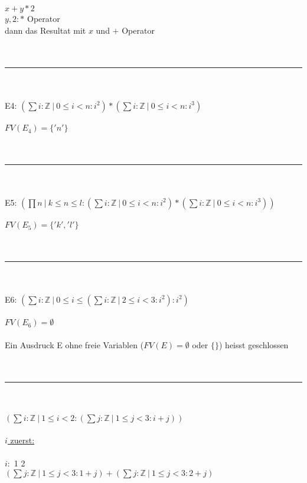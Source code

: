 \documentclass[18pt,a4paper]{article}
\newcommand{\tab}{\hspace*{2em}}
\begin{document}
$x + y * 2$\\
$y , 2 : *$ Operator\\
dann das Resultat mit $x$ und $+$ Operator\\
\\
\\
\rule{\textwidth}{0.4mm}\\
\\
E4: $(\sum{i} : \mathbb{Z} \:\vert\: 0\leqslant i< n : i^2 ) * (\sum{i} : \mathbb{Z} \:\vert\: 0\leqslant i< n : i^3 )$\\
\\
$FV(E_4) = \{'n'\}$\\
\\
\\
\rule{\textwidth}{0.4mm}\\
\\
E5: $( \prod{n} \:\vert\: k\leqslant n \leqslant l : (\sum{i} : \mathbb{Z} \:\vert\: 0\leqslant i< n : i^2 ) * (\sum{i} : \mathbb{Z} \:\vert\: 0\leqslant i< n : i^3 ) )$\\
\\
$FV(E_5) = \{'k', 'l'\}$\\
\\
\\
\rule{\textwidth}{0.4mm}\\
\\
E6: $(\sum{i} : \mathbb{Z} \:\vert\: 0\leqslant i\leqslant (\sum{i} : \mathbb{Z} \:\vert\: 2\leqslant i< 3 : i^2 ) : i^2 )$\\
\\
$FV(E_6) = \emptyset$\\
\\
Ein Ausdruck E ohne freie Variablen ($FV(E) = \emptyset$ oder $\{\}$) heisst geschlossen\\
\\
\\
\rule{\textwidth}{0.4mm}\\
\\
 $(\sum{i} : \mathbb{Z} \:\vert\: 1\leqslant i< 2 :  (\sum{j} : \mathbb{Z} \:\vert\: 1\leqslant j< 3 : i + j ) )$\\
\\
\uline{$i$ zuerst:}\\
\\
$i :$ \tab\tab\tab1 \tab\tab\tab\tab\tab\tab2\\
\tab $(\sum{j} : \mathbb{Z} \:\vert\: 1\leqslant j< 3 : 1 + j ) + (\sum{j} : \mathbb{Z} \:\vert\: 1\leqslant j< 3 : 2 + j )$\\
\\
\end{document}
